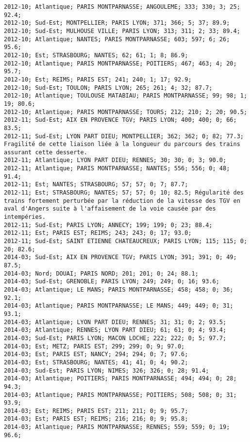 \documentclass{article}
\begin{document}
\begin{Verbatim}[commandchars=\\\{\}]
2012-10; Atlantique; PARIS MONTPARNASSE; ANGOULEME; 333; 330; 3; 25; 92.4; 
2012-10; Sud-Est; MONTPELLIER; PARIS LYON; 371; 366; 5; 37; 89.9; 
2012-10; Sud-Est; MULHOUSE VILLE; PARIS LYON; 313; 311; 2; 33; 89.4; 
2012-10; Atlantique; NANTES; PARIS MONTPARNASSE; 603; 597; 6; 26; 95.6; 
2012-10; Est; STRASBOURG; NANTES; 62; 61; 1; 8; 86.9; 
2012-10; Atlantique; PARIS MONTPARNASSE; POITIERS; 467; 463; 4; 20; 95.7; 
2012-10; Est; REIMS; PARIS EST; 241; 240; 1; 17; 92.9; 
2012-10; Sud-Est; TOULON; PARIS LYON; 265; 261; 4; 32; 87.7; 
2012-10; Atlantique; TOULOUSE MATABIAU; PARIS MONTPARNASSE; 99; 98; 1; 19; 80.6; 
2012-10; Atlantique; PARIS MONTPARNASSE; TOURS; 212; 210; 2; 20; 90.5; 
2012-11; Sud-Est; AIX EN PROVENCE TGV; PARIS LYON; 400; 400; 0; 66; 83.5; 
2012-11; Sud-Est; LYON PART DIEU; MONTPELLIER; 362; 362; 0; 82; 77.3; Fragilité de cette liaison liée à la longueur du parcours des trains assurant cette desserte.
2012-11; Atlantique; LYON PART DIEU; RENNES; 30; 30; 0; 3; 90.0; 
2012-11; Atlantique; PARIS MONTPARNASSE; NANTES; 556; 556; 0; 48; 91.4; 
2012-11; Est; NANTES; STRASBOURG; 57; 57; 0; 7; 87.7; 
2012-11; Est; STRASBOURG; NANTES; 57; 57; 0; 10; 82.5; Régularité des trains fortement perturbée par la réduction de la vitesse des TGV en aval d'Angers suite à l'affaisement de la voie causée par des intempéries.
2012-11; Sud-Est; PARIS LYON; ANNECY; 199; 199; 0; 23; 88.4; 
2012-11; Est; PARIS EST; REIMS; 243; 243; 0; 17; 93.0; 
2012-11; Sud-Est; SAINT ETIENNE CHATEAUCREUX; PARIS LYON; 115; 115; 0; 20; 82.6; 
2014-03; Sud-Est; AIX EN PROVENCE TGV; PARIS LYON; 391; 391; 0; 49; 87.5; 
2014-03; Nord; DOUAI; PARIS NORD; 201; 201; 0; 24; 88.1; 
2014-03; Sud-Est; GRENOBLE; PARIS LYON; 249; 249; 0; 16; 93.6; 
2014-03; Atlantique; LE MANS; PARIS MONTPARNASSE; 458; 458; 0; 36; 92.1; 
2014-03; Atlantique; PARIS MONTPARNASSE; LE MANS; 449; 449; 0; 31; 93.1; 
2014-03; Atlantique; LYON PART DIEU; RENNES; 31; 31; 0; 2; 93.5; 
2014-03; Atlantique; RENNES; LYON PART DIEU; 61; 61; 0; 4; 93.4; 
2014-03; Sud-Est; PARIS LYON; MACON LOCHE; 222; 222; 0; 5; 97.7; 
2014-03; Est; METZ; PARIS EST; 299; 299; 0; 9; 97.0; 
2014-03; Est; PARIS EST; NANCY; 294; 294; 0; 7; 97.6; 
2014-03; Est; STRASBOURG; NANTES; 41; 41; 0; 4; 90.2; 
2014-03; Sud-Est; PARIS LYON; NIMES; 326; 326; 0; 28; 91.4; 
2014-03; Atlantique; POITIERS; PARIS MONTPARNASSE; 494; 494; 0; 28; 94.3; 
2014-03; Atlantique; PARIS MONTPARNASSE; POITIERS; 508; 508; 0; 31; 93.9; 
2014-03; Est; REIMS; PARIS EST; 211; 211; 0; 9; 95.7; 
2014-03; Est; PARIS EST; REIMS; 216; 216; 0; 9; 95.8; 
2014-03; Atlantique; PARIS MONTPARNASSE; RENNES; 559; 559; 0; 19; 96.6; 

\end{Verbatim}
\end{document}
